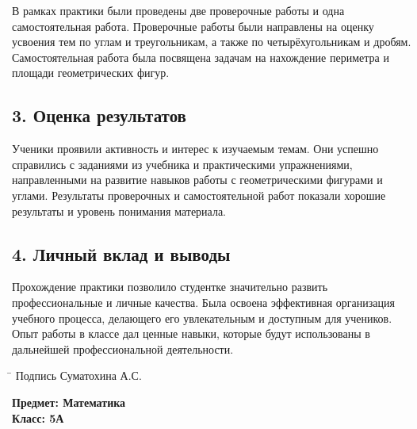 \documentclass[a4paper,12pt]{article}
\begin{document}
В рамках практики были проведены две проверочные работы и одна самостоятельная работа. Проверочные работы были направлены на оценку усвоения тем по углам и треугольникам, а также по четырёхугольникам и дробям. Самостоятельная работа была посвящена задачам на нахождение периметра и площади геометрических фигур.

\subsection*{3. Оценка результатов}

Ученики проявили активность и интерес к изучаемым темам. Они успешно справились с заданиями из учебника и практическими упражнениями, направленными на развитие навыков работы с геометрическими фигурами и углами. Результаты проверочных и самостоятельной работ показали хорошие результаты и уровень понимания материала.

\subsection*{4. Личный вклад и выводы}

Прохождение практики позволило студентке значительно развить профессиональные и личные качества. Была освоена эффективная организация учебного процесса, делающего его увлекательным и доступным для учеников. Опыт работы в классе дал ценные навыки, которые будут использованы в дальнейшей профессиональной деятельности.

\noindent
\begin{tabbing}
\hspace{2cm} \= \kill
Подпись \> \underline{\hspace{4cm}} Суматохина А.С.
\end{tabbing}

\vspace{5mm}

\noindent
\textbf{Предмет: Математика}\\
\textbf{Класс: 5А}\\
\end{document}
